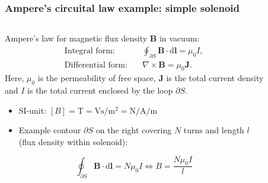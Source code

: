 \begin{frame}
	\frametitle{Ampere's circuital law example: simple solenoid}
	\begin{columns}
		\begin{column}{0.575\textwidth}
			Ampere's law for magnetic flux density $\bm{B}$ in vacuum:
            \begin{align}
                \mbox{Integral form:} \quad &\oint_{\partial S} \bm{B} \cdot \mathrm{d}\bm{l} = \mu_0 I,\\
                \mbox{Differential form:} \quad &\nabla \times \bm{B} = \mu_0\bm{J}. 
            \end{align}
            Here, $\mu_0$ is the permeability of free space, $\bm{J}$ is the total current density and $I$ is the total current enclosed by the loop $\partial S$. 
            \vspace{0.25cm}
            \begin{itemize}
                \item SI-unit: $[B] = \si{\tesla} = \si{\volt\second\per\metre\squared} = \si{\newton\per\ampere\per\metre}$
                \item Example contour $\partial S$  on the right covering $N$ turns and length $l$ (flux density within solenoid):
            \end{itemize}
            $$\oint_{\partial S} \bm{B} \cdot \mathrm{d}\bm{l} = N \mu_0 I  \Leftrightarrow B = \frac{N \mu_0 I}{l}$$
		\end{column}
        \hfill
		\begin{column}{0.425\textwidth}
            \vspace{-0.2cm}
			\begin{figure}
				\centering

\end{figure}
\end{column}
\end{columns}
\end{frame}
